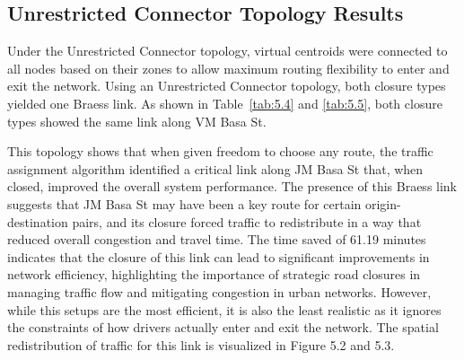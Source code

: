 \subsection{Unrestricted Connector Topology Results}
\label{sec:unrestricted_results}

\begin{table}[H]
    \centering
    \renewcommand{\thetable}{5.4}
    \caption{Bidirectional Unrestricted Connector Setup Results}
    \label{tab:5.4}
\end{table}

\begin{table}[H]
    \centering
    \renewcommand{\thetable}{5.5}
    \caption{Unidirectional Unrestricted Connector Setup Results}
    \label{tab:5.5}
\end{table}

Under the Unrestricted Connector topology, virtual centroids were connected to all nodes based on their zones to allow maximum routing flexibility to enter and exit the network. Using an Unrestricted Connector topology, both closure types yielded one Braess link. As shown in Table~\ref{tab:5.4} and \ref{tab:5.5}, both closure types showed the same link along VM Basa St. 



This topology shows that when given freedom to choose any route, the traffic assignment algorithm identified a critical link along JM Basa St that, when closed, improved the overall system performance. The presence of this Braess link suggests that JM Basa St may have been a key route for certain origin-destination pairs, and its closure forced traffic to redistribute in a way that reduced overall congestion and travel time. The time saved of 61.19 minutes indicates that the closure of this link can lead to significant improvements in network efficiency, highlighting the importance of strategic road closures in managing traffic flow and mitigating congestion in urban networks. However, while this setups are the most efficient, it is also the least realistic as it ignores the constraints of how drivers actually enter and exit the network. The spatial redistribution of traffic for this link is visualized in Figure 5.2 and
5.3.

